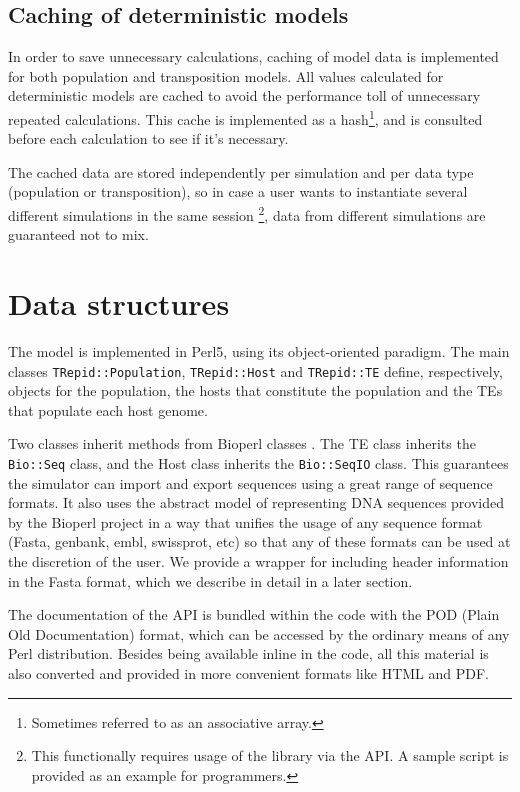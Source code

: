\documentclass[10pt]{article}
\begin{document}
\subsection{Caching of deterministic models}
\label{section:impl_caching}

In order to save unnecessary calculations, caching of model data is
implemented for both population and transposition models. All values
calculated for deterministic models are cached to avoid the
performance toll of unnecessary repeated calculations. This cache is
implemented as a hash\footnote{Sometimes referred to as an associative
  array.}, and is consulted before each calculation to see if it's
necessary.

The cached data are stored independently per simulation and per data
type (population or transposition), so in case a user wants to
instantiate several different simulations in the same
session \footnote{This functionally requires usage of the library via
  the API. A sample script is provided as an example for
  programmers.}, data from different simulations are guaranteed not to
mix.


\section{Data structures}
The model is implemented in Perl5, using its object-oriented
paradigm. The main classes \verb|TRepid::Population|,
\verb|TRepid::Host| and \verb|TRepid::TE| define, respectively,
objects for the population, the hosts that constitute the population
and the TEs that populate each host genome.

Two classes inherit methods from Bioperl classes \cite{SBB+02}. The TE
class inherits the \verb|Bio::Seq| class, and the Host class inherits
the \verb|Bio::SeqIO| class. This guarantees the simulator can import
and export sequences using a great range of sequence formats. It also
uses the abstract model of representing DNA sequences provided by the
Bioperl project in a way that unifies the usage of any sequence format
(Fasta, genbank, embl, swissprot, etc) so that any of these formats
can be used at the discretion of the user. We provide a wrapper for
including header information in the Fasta format, which we describe in
detail in a later section.

The documentation of the API is bundled within the code with the POD
(Plain Old Documentation) format, which can be accessed by the
ordinary means of any Perl distribution. Besides being available
inline in the code, all this material is also converted and provided
in more convenient formats like HTML and PDF.
\end{document}

